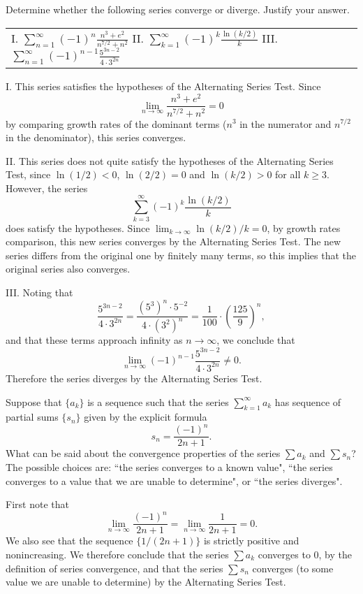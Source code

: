 \documentclass[]{ximera}
\begin{document}
\begin{problem}
Determine whether the following series converge or diverge. Justify your answer.
\begin{center}
\begin{tabular}{lll}
I. $\sum_{n=1}^\infty (-1)^n \frac{n^3+e^2}{n^{7/2}+n^2}$ \hspace{.2in} II. $\sum_{k=1}^\infty (-1)^k \frac{\ln(k/2)}{k}$ \hspace{.2in} III. $\sum_{n=1}^\infty (-1)^{n-1} \frac{5^{3n-2}}{4 \cdot 3^{2n}}$ 
\end{tabular}
\end{center}

\begin{solution}
I. This series satisfies the hypotheses of the Alternating Series Test. Since 
$$
\lim_{n\rightarrow \infty}  \frac{n^3+e^2}{n^{7/2}+n^2} = 0
$$
by comparing growth rates of the dominant terms ($n^3$ in the numerator and $n^{7/2}$ in the denominator), this series converges.

II. This series does not quite satisfy the hypotheses of the Alternating Series Test, since $\ln(1/2) < 0$, $\ln(2/2) = 0$ and $\ln(k/2) > 0$ for all $k \geq 3$. However, the series
$$
\sum_{k=3}^\infty (-1)^k \frac{\ln(k/2)}{k}
$$
does satisfy the hypotheses. Since $\lim_{k \rightarrow \infty} \ln(k/2)/k = 0$, by growth rates comparison, this new series converges by the Alternating Series Test. The new series differs from the original one by finitely many terms, so this implies that the original series also converges.

III. Noting that
$$
\frac{5^{3n-2}}{4 \cdot 3^{2n}} = \frac{(5^3)^n \cdot 5^{-2}}{4 \cdot (3^2)^n} = \frac{1}{100} \cdot \left(\frac{125}{9}\right)^n,
$$
and that these terms approach infinity as $n \rightarrow \infty$, we conclude that 
$$
\lim_{n\rightarrow \infty} (-1)^{n-1} \frac{5^{3n-2}}{4 \cdot 3^{2n}} \neq 0.
$$
Therefore the series diverges by the Alternating Series Test.
\end{solution}
\end{problem}

\begin{problem}
Suppose that $\{a_k\}$ is a sequence such that the series $\sum_{k=1}^\infty a_k$ has sequence of partial sums $\{s_n\}$ given by the explicit formula
$$
s_n = \frac{(-1)^n}{2n+1}.
$$
What can be said about the convergence properties of the series $\sum a_k$ and $\sum s_n$? The possible choices are: ``the series converges to a known value", ``the series converges to a value that we are unable to determine", or ``the series diverges". 

\begin{solution}
First note that 
$$
\lim_{n\rightarrow \infty} \frac{(-1)^n}{2n+1} = \lim_{n\rightarrow \infty} \frac{1}{2n+1} = 0.
$$
We also see that the sequence $\{1/(2n+1)\}$ is strictly positive and nonincreasing. We therefore conclude that the series $\sum a_k$ converges to $0$, by the definition of series convergence, and that the series $\sum s_n$ converges (to some value we are unable to determine) by the Alternating Series Test.
\end{solution}
\end{problem}
\end{document}
